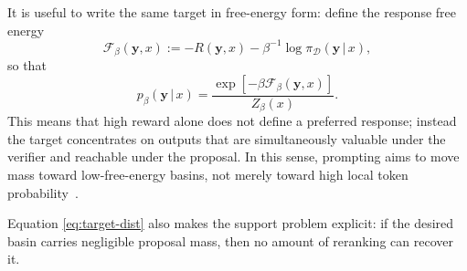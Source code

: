 \documentclass[aps,pre,reprint,superscriptaddress,nofootinbib]{revtex4-2}
\newcommand{\given}{\,|\,}
\newcommand{\y}{\mathbf{y}}
\begin{document}
It is useful to write the same target in free-energy form: define the response free energy
\begin{equation}
\mathcal F_\beta(\y,x):=-R(\y,x)-\beta^{-1}\log \pi_{\mathcal D}(\y \given x),
\label{eq:response-free-energy}
\end{equation}
so that
\begin{equation}
p_\beta(\y \given x)=\frac{\exp[-\beta \mathcal F_\beta(\y,x)]}{Z_\beta(x)}.
\label{eq:target-free-energy}
\end{equation}
This means that high reward alone does not define a preferred response; instead the target concentrates on outputs that are simultaneously valuable under the verifier and reachable under the proposal.
In this sense, prompting aims to move mass toward low-free-energy basins, not merely toward high local token probability~\cite{mukherjee2025test}.

Equation \eqref{eq:target-dist} also makes the support problem explicit: if the desired basin carries negligible proposal mass, then no amount of reranking can recover it.

\end{document}
